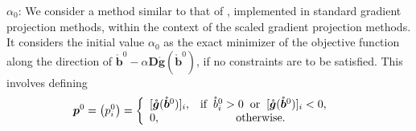 \documentclass[twocolumn]{svjour3}
\begin{document}
\begin{compactitem}
	\item $\alpha_0$: We consider a method similar to that of \citet{Figueiredo2007}, implemented in standard gradient projection methods, within the context of the scaled gradient projection methods. It considers the initial value $\alpha_{0}$ as the exact minimizer of the objective function along the direction of $\mathring{\bm{b}}^{0} - \alpha \bm{D} \mathring{\bm{g}}(\mathring{\bm{b}}^{0})$, if no constraints are to be satisfied. This involves defining
	\begin{align*}
	\bm{p}^{0} = \left(p^{0}_{i}\right) & =
	\left\{\begin{array}{ll}
	[\mathring{\bm{g}}(\mathring{\bm{b}}^{0})]_{i}, & \mbox{$\text{if} \hspace{2mm} \mathring{b}_{i}^{0} > 0 \hspace{2mm} \text{or} \hspace{2mm} [\mathring{\bm{g}}(\mathring{\bm{b}}^{0})]_{i} < 0,$} \\
	0,                                      & \mbox{\hspace{1cm} \text{otherwise}}.
	\end{array}\right.
	\end{align*}
	

\end{compactitem}
\end{document}
